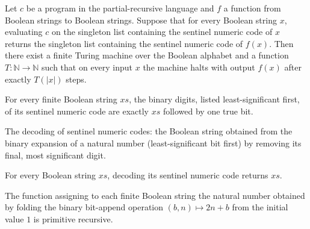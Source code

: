 \begin{lemma}
\label{Turing.bridge_binary}
\leanok
{}
Let $c$ be a program in the partial-recursive language and $f$ a function from Boolean
strings to Boolean strings. Suppose that for every Boolean string $x$, evaluating $c$ on
the singleton list containing the sentinel numeric code of $x$ returns the singleton
list containing the sentinel numeric code of $f(x)$. Then there exist a finite Turing
machine over the Boolean alphabet and a function $T:\mathbb{N}\to\mathbb{N}$ such that
on every input $x$ the machine halts with output $f(x)$ after exactly $T(|x|)$ steps.
\end{lemma}

\begin{lemma}
\label{Turing.bridgeNumber_bits}
\leanok
{}
For every finite Boolean string $xs$, the binary digits, listed least-significant first,
of its sentinel numeric code are exactly $xs$ followed by one true bit.
\end{lemma}

\begin{definition}
\label{Turing.bridgeUnnumber}
\leanok
The decoding of sentinel numeric codes: the Boolean string obtained from the binary
expansion of a natural number (least-significant bit first) by removing its final,
most significant digit.
\end{definition}

\begin{lemma}
\label{Turing.bridgeUnnumber_number}
\leanok
{}
For every Boolean string $xs$, decoding its sentinel numeric code returns $xs$.
\end{lemma}

\begin{lemma}
\label{Turing.bridgePrimNumber}
\leanok
{}
The function assigning to each finite Boolean string the natural number obtained by
folding the binary bit-append operation $(b,n)\mapsto 2n+b$ from the initial value $1$
is primitive recursive.
\end{lemma}

